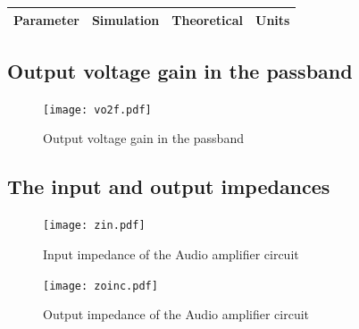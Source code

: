 \hfill
 \parbox{1\linewidth}{
  \centering
  \begin{tabular}{|l|l|l|r|}
    \hline    
    {\bf Parameter} & {\bf Simulation} & {\bf Theoretical } & {\bf Units }\\ \hline
    
  \end{tabular}
  \label{tab:results}
  }

  

\subsection{Output voltage gain in the passband}
\par
\vspace{-4cm}
\begin{figure}[H] \centering
\texttt{[image: vo2f.pdf]}
\vspace{-1cm}
\caption{Output voltage gain in the passband}
\label{fig:gain_sim}
\end{figure}


\subsection{The input and output impedances}

\begin{figure}[H] \centering
\texttt{[image: zin.pdf]}
\caption{Input impedance of the Audio amplifier circuit}
\label{fig:In_imp}
\end{figure}
\vspace{-3cm}


\begin{figure}[H] \centering
\texttt{[image: zoinc.pdf]}
\caption{Output impedance of the Audio amplifier circuit}
\label{fig:out_imp}
\end{figure}
\vspace{-3cm}


\pagebreak
